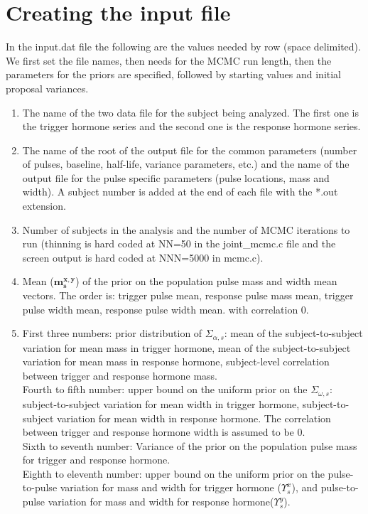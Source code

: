 \documentclass[12pt, oneside]{article}   	%
\begin{document}
\section{Creating the input file}
In the input.dat file the following are the values needed by row (space delimited). We first set the file names, then needs for the MCMC run length, then the parameters for the priors are specified, followed by starting values and initial proposal variances.
\begin{enumerate}
\item The name of the two data file for the subject being analyzed. The first one is the trigger hormone series and the second one is the response hormone series.
\item The name of the root of the output file for the common parameters (number of pulses, baseline, half-life, variance parameters, etc.) and the name of the output file for the pulse specific parameters (pulse locations, mass and width). A subject number is added at the end of each file with the *.out extension.
\item Number of subjects in the analysis and the number of MCMC iterations to run (thinning is hard coded at NN=50 in the joint\_mcmc.c file and the screen output is hard coded at NNN=5000 in mcmc.c).
\item Mean ($\boldsymbol{m^{x,y}_{s}}$) of the prior on the population pulse mass and width mean vectors. The order is: trigger pulse mean, response pulse mass mean, trigger pulse width mean, response pulse width mean.
with correlation 0.
\item First three numbers: prior distribution of $\Sigma_{\alpha,s}$: mean of the subject-to-subject variation for mean mass in trigger hormone,  mean of the subject-to-subject variation for mean mass in response hormone, subject-level correlation between trigger and response hormone mass.\\
Fourth to fifth number: upper bound on the uniform prior on the $\Sigma_{\omega,s}$: subject-to-subject variation for mean width in trigger hormone,  subject-to-subject variation for mean width in response hormone. The correlation between trigger and response hormone width is assumed to be 0.\\
Sixth to seventh number: Variance of the prior on the population pulse mass for trigger and response hormone.\\
Eighth to eleventh number: upper bound on the uniform prior on the pulse-to-pulse variation  for mass and width for trigger hormone ($\Upsilon^x_s$), and  pulse-to-pulse variation for mass and width for response hormone($\Upsilon^y_s$). \\

\end{enumerate}
\end{document}
